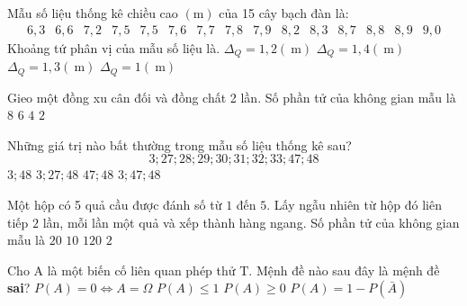 \begin{ex}%
	Mẫu số liệu thống kê chiều cao $(\mathrm{m})$ của 15 cây bạch đàn là:
	$$
	\begin{array}{lllllllllllllll}
		6,3 & 6,6 & 7,2 & 7,5 & 7,5 & 7,6 & 7,7 & 7,8 & 7,9 & 8,2 & 8,3 & 8,7 & 8,8 & 8,9 & 9,0
	\end{array}
	$$
	Khoảng tứ phân vị của mẫu số liệu là.
	\choice
	{\True $\Delta_Q=1,2(\mathrm{~m})$}
	{$\Delta_Q=1,4(\mathrm{~m})$}
	{$\Delta_Q=1,3(\mathrm{~m})$}
	{$\Delta_Q=1(\mathrm{~m})$}
\end{ex}

\begin{ex}%
	Gieo một đồng xu cân đối và đồng chất 2 lần. Số phần tử của không gian mẫu là
	\choice
	{$ 8  $}
	{$ 6  $}
 	{\True $ 4  $}
	{$ 2 $ }
\end{ex}

\begin{ex}%
	Những giá trị nào bất thường trong mẫu số liệu thống kê sau? 
	 $$3 ; 27 ; 28 ; 29 ; 30 ; 31 ; 32 ; 33 ; 47 ; 48$$
	\choice
	{$3 ; 48$}
	{$3 ; 27 ; 48$}
	{$47 ; 48$}
	{\True $3 ; 47 ; 48$}
\end{ex}

\begin{ex}%
	Một hộp có 5 quả cầu được đánh số từ $ 1 $ đến $ 5  $. Lấy ngẫu nhiên từ hộp đó liên tiếp $ 2 $ lần, mỗi lần một quả và xếp thành hàng ngang. Số phần tử của không gian mẫu là
	\choice
	{\True $ 20  $}
	{$ 10  $}
	{$ 120  $}
	{$ 2  $}
\end{ex}

\begin{ex}%
	Cho $\mathrm{A}$ là một biến cố liên quan phép thử $\mathrm{T}$. Mệnh đề nào sau đây là mệnh đề \textbf{sai}?
	\choice
	{$P(A)=0 \Leftrightarrow A=\Omega$}
	{$P(A) \leq 1$}
	{$P(A) \geq 0$}
	{$P(A)=1-P(\bar{A})$}
\end{ex}

